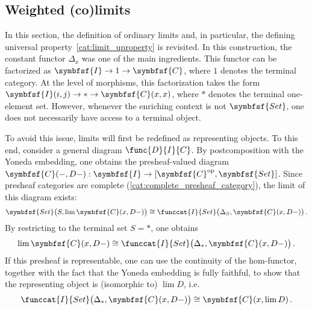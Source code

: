 
\subsection{Weighted (co)limits}\label{section:weighted_limits}

    In this section, the definition of ordinary limits and, in particular, the defining universal property~\ref{cat:limit_uproperty} is revisited. In this construction, the constant functor $\Delta_x$ was one of the main ingredients. This functor can be factorized as $\symbfsf{I}\rightarrow1\rightarrow\symbfsf{C}$, where $1$ denotes the terminal category. At the level of morphisms, this factorization takes the form $\symbfsf{I}(i,j)\rightarrow\ast\rightarrow\symbfsf{C}(x,x)$, where $\ast$ denotes the terminal one-element set. However, whenever the enriching context is not $\symbfsf{Set}$, one does not necessarily have access to a terminal object.

    To avoid this issue, limits will first be redefined as representing objects. To this end, consider a general diagram $\func{D}{I}{C}$. By postcomposition with the Yoneda embedding, one obtains the presheaf-valued diagram $\symbfsf{C}(-,D-):\symbfsf{I}\rightarrow[\symbfsf{C}^{\text{op}},\symbfsf{Set}]$. Since presheaf categories are complete (\cref{cat:complete_presheaf_category}), the limit of this diagram exists:
    \begin{gather}
        \symbfsf{Set}\bigl(S,\lim\symbfsf{C}(x,D-)\bigr)\cong\funccat{I}{Set}\bigl(\Delta_S,\symbfsf{C}(x,D-)\bigr)\,.
    \end{gather}
    By restricting to the terminal set $S=\ast$, one obtains
    \begin{gather}
        \lim\symbfsf{C}(x,D-)\cong\funccat{I}{Set}\bigl(\Delta_\ast,\symbfsf{C}(x,D-)\bigr)\,.
    \end{gather}
    If this presheaf is representable, one can use the continuity of the hom-functor, together with the fact that the Yoneda embedding is fully faithful, to show that the representing object is (isomorphic to) $\lim D$, i.e.
    \begin{gather}
        \funccat{I}{Set}\bigl(\Delta_\ast,\symbfsf{C}(x,D-)\bigr)\cong\symbfsf{C}(x,\lim D)\,.
    \end{gather}

